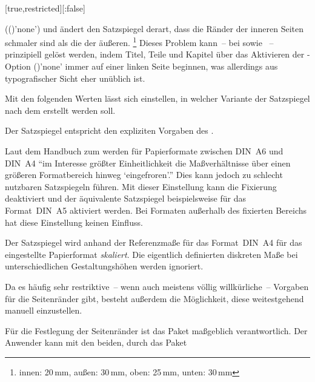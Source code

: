 \begin{Declaration*}{}
\begin{Declaration*}{}
\begin{Declaration*}{}
\begin{Declaration}[%
  v2.03;
  v2.05!\Option{cdgeometry=restricted};%
  v2.05!\Option{cdgeometry=adapted};%
  v2.05!\Option{cdgeometry=calculated};%
  v2.05!\Option{cdgeometry=custom};%
]{}[true,restricted][:false]
\begin{values}{}
  (()'none') und ändert den Satzspiegel 
  derart, dass die Ränder der inneren Seiten schmaler sind als die der äußeren.%
  \footnote{innen: 20\,mm, außen: 30\,mm, oben: 25\,mm, unten: 30\,mm}
  Dieses Problem kann~-- bei  sowie ~-- 
  prinzipiell gelöst werden, indem Titel, Teile und Kapitel über das Aktivieren 
  der \KOMAScript-Option ()'none' immer 
  auf einer linken Seite beginnen, was allerdings aus typografischer Sicht eher 
  unüblich ist.
\end{values}
%
Mit den folgenden Werten lässt sich einstellen, in welcher Variante der 
Satzspiegel nach dem \TUDCD erstellt werden soll. 
%
\begin{values}{}
\item[restricted]
  Der Satzspiegel entspricht den expliziten Vorgaben des \CDs.
\item[adapted]
  Laut dem Handbuch zum \CD werden für Papierformate zwischen DIN~A6 und DIN~A4 
  \enquote{im Interesse größter Einheitlichkeit die Maßverhältnisse über einen 
  größeren Formatbereich hinweg \enquote{eingefroren}.} Dies kann jedoch zu 
  schlecht nutzbaren Satzspiegeln führen. Mit dieser Einstellung kann die 
  Fixierung deaktiviert und der äquivalente Satzspiegel beispielsweise für das 
  Format~DIN~A5 aktiviert werden. Bei Formaten außerhalb des fixierten Bereichs 
  hat diese Einstellung keinen Einfluss. 
\item[calculated]
  Der Satzspiegel wird anhand der Referenzmaße für das Format~DIN~A4 für das 
  eingestellte Papierformat \emph{skaliert}. Die eigentlich definierten 
  diskreten Maße bei unterschiedlichen Gestaltungshöhen werden ignoriert.
\end{values}
%
Da es häufig sehr restriktive~-- wenn auch meistens völlig willkürliche~-- 
Vorgaben für die Seitenränder gibt, besteht außerdem die Möglichkeit, diese 
weitestgehend manuell einzustellen. 
\begin{values}{}
\item[custom]
  Für die Festlegung der Seitenränder ist das Paket  
  maßgeblich verantwortlich. Der Anwender kann mit den beiden, durch das Paket 

\end{values}
\end{Declaration}
\end{Declaration*}
\end{Declaration*}
\end{Declaration*}
